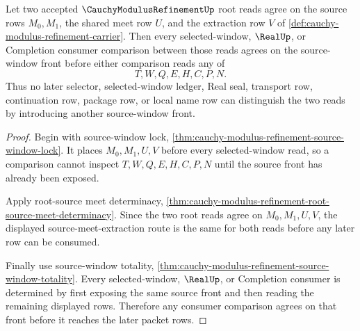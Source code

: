 \begin{theorem}
\label{thm:cauchy-modulus-refinement-source-window-comparison-lock}
Let two accepted $\CauchyModulusRefinementUp$ root reads agree on the source rows $M_0,M_1$, the shared meet row $U$, and the extraction row $V$ of \autoref{def:cauchy-modulus-refinement-carrier}. Then every selected-window, $\RealUp$, or Completion consumer comparison between those reads agrees on the source-window front before either comparison reads any of
$$
T,W,Q,E,H,C,P,N.
$$
Thus no later selector, selected-window ledger, Real seal, transport row, continuation row, package row, or local name row can distinguish the two reads by introducing another source-window front.
\end{theorem}
\begin{proof}
Begin with source-window lock, \autoref{thm:cauchy-modulus-refinement-source-window-lock}. It places $M_0,M_1,U,V$ before every selected-window read, so a comparison cannot inspect $T,W,Q,E,H,C,P,N$ until the source front has already been exposed.

Apply root-source meet determinacy, \autoref{thm:cauchy-modulus-refinement-root-source-meet-determinacy}. Since the two root reads agree on $M_0,M_1,U,V$, the displayed source-meet-extraction route is the same for both reads before any later row can be consumed.

Finally use source-window totality, \autoref{thm:cauchy-modulus-refinement-source-window-totality}. Every selected-window, $\RealUp$, or Completion consumer is determined by first exposing the same source front and then reading the remaining displayed rows. Therefore any consumer comparison agrees on that front before it reaches the later packet rows.
\end{proof}

